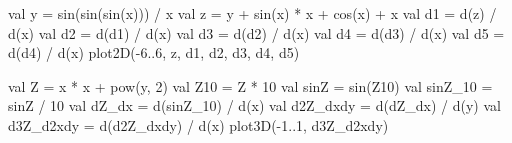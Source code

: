 \documentclass[portrait,a0b,final,a4resizeable]{a0poster}
\def\jointspacing{\vspace{0.3in}}
\begin{document}
\begin{poster}
\begin{multicols}{2}
      \vspace*{-2cm}
\null\hspace*{2cm}\begin{minipage}[c]{0.48\columnwidth}
\begin{kotlinlisting}
val y = sin(sin(sin(x))) / x
val z = y + sin(x) * x + cos(x) + x
val d1 = d(z) / d(x)
val d2 = d(d1) / d(x)
val d3 = d(d2) / d(x)
val d4 = d(d3) / d(x)
val d5 = d(d4) / d(x)
plot2D(-6..6, z, d1, d2, d3, d4, d5)
\end{kotlinlisting}
\end{minipage}
    \null\hspace*{2cm}\begin{minipage}[c]{0.40\columnwidth} \vspace*{1.5cm}\center{}\end{minipage}

\null\hspace*{2cm}\begin{minipage}[c]{0.515\columnwidth}
\begin{kotlinlisting}
val Z = x * x + pow(y, 2)
val Z10 = Z * 10
val sinZ = sin(Z10)
val sinZ_10 = sinZ / 10
val dZ_dx = d(sinZ_10) / d(x)
val d2Z_dxdy = d(dZ_dx) / d(y)
val d3Z_d2xdy = d(d2Z_dxdy) / d(x)
plot3D(-1..1, d3Z_d2xdy)
\end{kotlinlisting}
\end{minipage}
      \null\hspace*{2cm}\begin{minipage}[c]{0.30\columnwidth}\center{}\end{minipage}

      \jointspacing





\end{multicols}
\end{poster}
\end{document}
